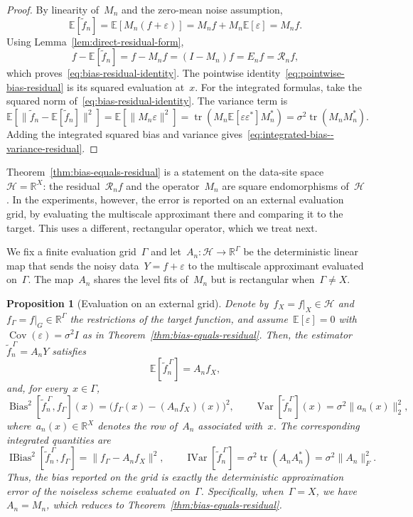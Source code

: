 \documentclass[12pt]{article}
\newtheorem{proposition}[theorem]{Proposition}
\newcommand{\E}{{\mathbb{E}}}
\newcommand{\R}{\mathbb{R}}
\newcommand{\ibias}{\operatorname{IBias}^2}
\newcommand{\bias}{\operatorname{Bias}^2}
\DeclareMathOperator{\ivar}{IVar}
\DeclareMathOperator{\var}{Var}
\begin{document}
\begin{proof}
By linearity  of~$M_n$ and the zero-mean noise assumption,
\[
    \E[\widetilde f_n]
    =\E[M_n(f+\varepsilon)]
    =M_nf+M_n\E[\varepsilon]
    =M_nf.
\]
Using Lemma~\ref{lem:direct-residual-form},
\[
    f-\E[\widetilde f_n]
    =f-M_nf
    =(I-M_n)f
    =E_nf
    =\mathcal R_nf,
\]
which proves~\eqref{eq:bias-residual-identity}. The pointwise identity~\eqref{eq:pointwise-bias-residual} is its squared evaluation at~$x$. For the integrated formulas, take the squared norm of~\eqref{eq:bias-residual-identity}. The variance term is
\[
    \E\left[\|\widetilde f_n-\E[\widetilde f_n]\|^2\right]
    =\E\left[\|M_n\varepsilon\|^2\right]
    =\operatorname{tr}\left(M_n\E[\varepsilon\varepsilon^*]M_n^*\right)
    =\sigma^2\operatorname{tr}(M_nM_n^*).
\]
Adding the integrated squared bias and variance gives~\eqref{eq:integrated-bias--variance-residual}.
\end{proof}
Theorem~\ref{thm:bias-equals-residual} is a statement on the data-site space~$\mathcal H=\R^{X}$: the residual~$\mathcal R_nf$ and the operator~$M_n$ are square endomorphisms of~$\mathcal H$. In the experiments, however, the error is reported on an external evaluation grid, by evaluating the multiscale approximant there and comparing it to the target. This uses a different, rectangular operator, which we treat next.

We fix a finite evaluation grid~$\Gamma$ and let~$A_n:\mathcal H\to\R^{\Gamma}$ be the deterministic linear map that sends the noisy data~$Y = f + \varepsilon$ to the multiscale approximant evaluated on~$\Gamma$. The map~$A_n$ shares the level fits of~$M_n$ but is rectangular when~$\Gamma\neq X$.

\begin{proposition}[Evaluation on an external grid]\label{prop:grid-evaluation}
Denote by~$f_X=f|_X\in\mathcal H$ and~$f_\Gamma=f|_G\in\R^{\Gamma}$ the restrictions of the target function, and assume~$\E[\varepsilon]=0$ with $\operatorname{Cov}(\varepsilon)=\sigma^2I$ as in Theorem~\ref{thm:bias-equals-residual}. Then, the estimator~$\widetilde f_n^{\,\Gamma}=A_nY$ satisfies
\[
    \E[\widetilde f_n^{\,\Gamma}]=A_nf_X ,
\]
and, for every~$x\in\Gamma$,
\[
    \bias[\widetilde f_n^{\,\Gamma},f_\Gamma](x)=\big(f_\Gamma(x)-(A_nf_X)(x)\big)^2,
    \qquad
    \var[\widetilde f_n^{\,\Gamma}](x)=\sigma^2\|a_n(x)\|_2^2 ,
\]
where~$a_n(x)\in\R^{X}$ denotes the row of~$A_n$ associated with~$x$. The corresponding integrated quantities are
\[
    \ibias[\widetilde f_n^{\,\Gamma},f_\Gamma]=\|f_\Gamma-A_nf_X\|^2,
    \qquad
    \ivar[\widetilde f_n^{\,\Gamma}]=\sigma^2\operatorname{tr}(A_nA_n^{*})=\sigma^2\|A_n\|_F^2 .
\]
Thus, the bias reported on the grid is exactly the deterministic approximation error of the noiseless scheme evaluated on~$\Gamma$. Specifically, when~$\Gamma=X$, we have~$A_n=M_n$, which reduces to Theorem~\ref{thm:bias-equals-residual}.
\end{proposition}
\end{document}
